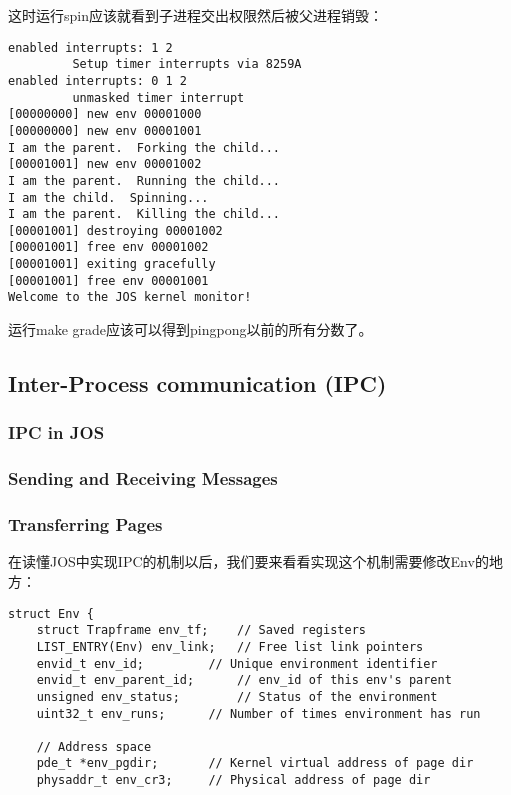 \documentclass{article}
\begin{document}
\begin{CJK*}{UTF8}{gkai}
这时运行spin应该就看到子进程交出权限然后被父进程销毁：

\begin{lstlisting}[style=console]
enabled interrupts: 1 2
	     Setup timer interrupts via 8259A
enabled interrupts: 0 1 2
	     unmasked timer interrupt
[00000000] new env 00001000
[00000000] new env 00001001
I am the parent.  Forking the child...
[00001001] new env 00001002
I am the parent.  Running the child...
I am the child.  Spinning...
I am the parent.  Killing the child...
[00001001] destroying 00001002
[00001001] free env 00001002
[00001001] exiting gracefully
[00001001] free env 00001001
Welcome to the JOS kernel monitor!
\end{lstlisting}

运行make grade应该可以得到pingpong以前的所有分数了。


\subsection{Inter-Process communication (IPC)}

\subsubsection{IPC in JOS}

\subsubsection{Sending and Receiving Messages}

\subsubsection{Transferring Pages}

在读懂JOS中实现IPC的机制以后，我们要来看看实现这个机制需要修改Env的地方：

\begin{lstlisting}[style=ccode, firstnumber=38, title={\scriptsize \ttfamily \bfseries inc/env.h}]
struct Env {
	struct Trapframe env_tf;	// Saved registers
	LIST_ENTRY(Env) env_link;	// Free list link pointers
	envid_t env_id;			// Unique environment identifier
	envid_t env_parent_id;		// env_id of this env's parent
	unsigned env_status;		// Status of the environment
	uint32_t env_runs;		// Number of times environment has run

	// Address space
	pde_t *env_pgdir;		// Kernel virtual address of page dir
	physaddr_t env_cr3;		// Physical address of page dir


\end{lstlisting}
\end{CJK*}
\end{document}
